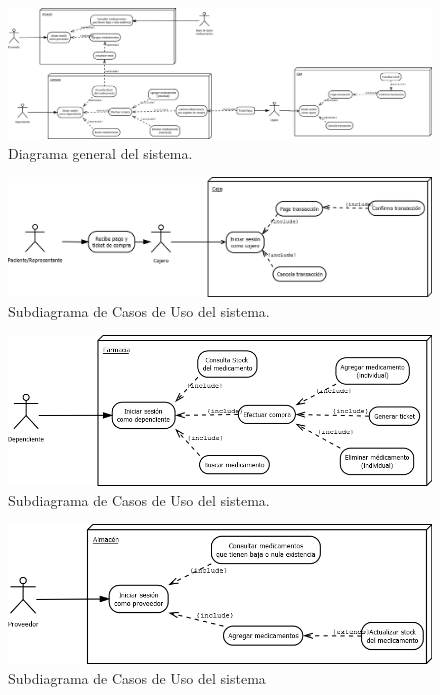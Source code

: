 \documentclass[oneside,10pt]{book}
\begin{document}
	
	\begin{figure}[htbp!]
		\includegraphics[width=1.1\textwidth]{images/cu/diagramaGral4}
		\caption{Diagrama general del sistema.}
	\end{figure}
	\begin{figure}[htbp!]
		\centering
			\includegraphics[width=1\textwidth]{images/cu/caja}
		\caption{Subdiagrama de Casos de Uso del sistema.}
	\end{figure}
	\begin{figure}[htbp!]
		\centering
			\includegraphics[width=1\textwidth]{images/cu/farmacia}
		\caption{Subdiagrama de Casos de Uso del sistema.}
	\end{figure}
	\begin{figure}[htbp!]
		\centering
			\includegraphics[width=1\textwidth]{images/cu/almacen}
		\caption{Subdiagrama de Casos de Uso del sistema}
	\end{figure}
	
\end{document}
